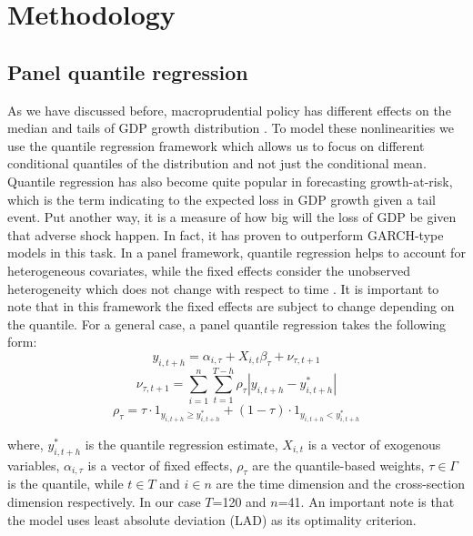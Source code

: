 \section{Methodology}
\subsection{Panel quantile regression}
As we have discussed before, macroprudential policy has different effects on the median and tails of GDP growth distribution \citep{boar_2017}. To model these nonlinearities we use the quantile regression framework \citep{koenker_1978_regression} which allows us to focus on different conditional quantiles of the distribution and not just the conditional mean. Quantile regression has also become quite popular in forecasting growth-at-risk, which is the term indicating to the expected loss in GDP growth given a tail event. Put another way, it is a measure of how big will the loss of GDP be given that adverse shock happen. In fact, it has proven to outperform GARCH-type models \citep{kipriyanov_2022} in this task. In a panel framework, quantile regression helps to account for heterogeneous covariates, while the fixed effects consider the unobserved heterogeneity which does not change with respect to time \citep{galan2020}. It is important to note that in this framework the fixed effects are subject to change depending on the quantile. For a general case, a panel quantile regression takes the following form:
\begin{equation}
    \label{eq:panel_qr}
    y_{i,t+h} = \alpha_{i, \tau} + X_{i,t} \beta_\tau + \nu_{\tau,t+1}
\end{equation}
\begin{equation}
    \label{eq:panel_qr_loss}
    \nu_{\tau,t+1} = \sum_{i=1}^n \sum_{t=1}^{T-h}\rho_\tau| y_{i,t+h} -  y_{i,t+h}^*|
\end{equation}
\begin{equation}
    \label{eq:panel_qr_weights}
    \rho_\tau = \tau \cdot 1_{y_{i,t+h} \geq y_{i,t+h}^*} + (1-\tau) \cdot 1_{y_{i,t+h} < y_{i,t+h}^*}
\end{equation}

where, $y_{i,t+h}^*$ is the quantile regression estimate, $X_{i,t}$ is a vector of exogenous variables, $\alpha_{i, \tau}$ is a vector of fixed effects, $\rho_\tau$ are the quantile-based weights, $\tau\in\Gamma$ is the quantile, while $t\in T$ and $i\in n$ are the time dimension and the cross-section dimension respectively. In our case $T$=120 and $n$=41. An important note is that the model uses least absolute deviation (LAD) as its optimality criterion.

